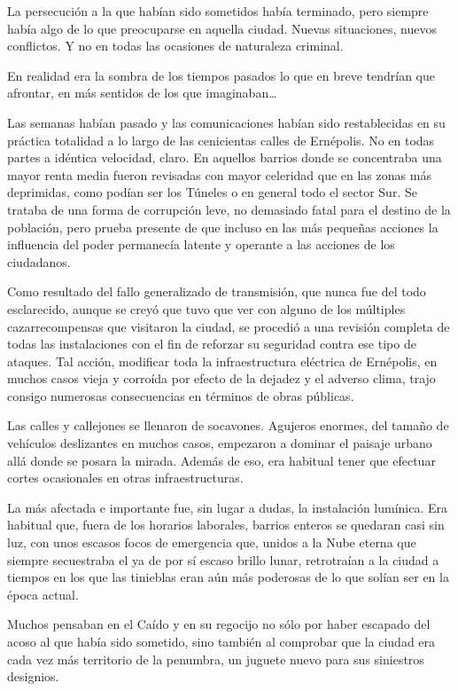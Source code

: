 La persecución a la que habían sido sometidos había terminado, pero siempre había algo de lo que preocuparse en aquella ciudad. Nuevas situaciones, nuevos conflictos. Y no en todas las ocasiones de naturaleza criminal.

En realidad era la sombra de los tiempos pasados lo que en breve tendrían que afrontar, en más sentidos de los que imaginaban\dots

\fancyparbreak
Las semanas habían pasado y las comunicaciones habían sido restablecidas en su práctica totalidad a lo largo de las cenicientas calles de Ernépolis. No en todas partes a idéntica velocidad, claro. En aquellos barrios donde se concentraba una mayor renta media fueron revisadas con mayor celeridad que en las zonas más deprimidas, como podían ser los Túneles o en general todo el sector Sur. Se trataba de una forma de corrupción leve, no demasiado fatal para el destino de la población, pero prueba presente de que incluso en las más pequeñas acciones la influencia del poder permanecía latente y operante a las acciones de los ciudadanos.

Como resultado del fallo generalizado de transmisión, que nunca fue del todo esclarecido, aunque se creyó que tuvo que ver con alguno de los múltiples cazarrecompensas que visitaron la ciudad, se procedió a una revisión completa de todas las instalaciones con el fin de reforzar su seguridad contra ese tipo de ataques. Tal acción, modificar toda la infraestructura eléctrica de Ernépolis, en muchos casos vieja y corroída por efecto de la dejadez y el adverso clima, trajo consigo numerosas consecuencias en términos de obras públicas.

Las calles y callejones se llenaron de socavones. Agujeros enormes, del tamaño de vehículos deslizantes en muchos casos, empezaron a dominar el paisaje urbano allá donde se posara la mirada. Además de eso, era habitual tener que efectuar cortes ocasionales en otras infraestructuras.

La más afectada e importante fue, sin lugar a dudas, la instalación lumínica. Era habitual que, fuera de los horarios laborales, barrios enteros se quedaran casi sin luz, con unos escasos focos de emergencia que, unidos a la Nube eterna que siempre secuestraba el ya de por sí escaso brillo lunar, retrotraían a la ciudad a tiempos en los que las tinieblas eran aún más poderosas de lo que solían ser en la época actual.

Muchos pensaban en el Caído y en su regocijo no sólo por haber escapado del acoso al que había sido sometido, sino también al comprobar que la ciudad era cada vez más territorio de la penumbra, un juguete nuevo para sus siniestros designios.

